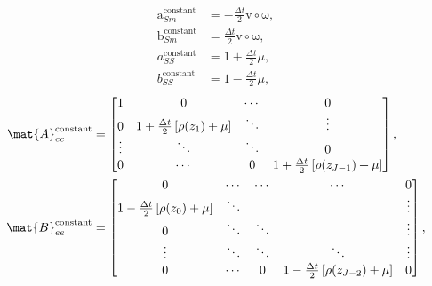 \documentclass{jpmarticle}
\renewcommand{\vec}[1]{\boldsymbol{\mathrm{#1}}}
\begin{document}
\begin{equation}
  \begin{split}
    \vec{a}_{Sm}^{\text{constant}} &=
    - \frac{\Delta t}{2} \vec{v} \circ \vec{\omega},
    \\
    \vec{b}_{Sm}^{\text{constant}} &=
    \frac{\Delta t}{2} \vec{v} \circ \vec{\omega},
    \\
    a_{SS}^{\text{constant}} &=
    1 + \frac{\Delta t}{2} \mu,
    \\
    b_{SS}^{\text{constant}} &=
    1 - \frac{\Delta t}{2} \mu,
  \end{split}
\end{equation}
\begin{equation}
  \begin{split}
    \mat{A}_{ee}^{\text{constant}} &=
    \begin{bmatrix}
      1 & 0 & \cdots & 0
      \\
      0 & 1 + \frac{\Delta t}{2} \left[\rho(z_1) + \mu\right] &
      \ddots & \vdots
      \\
      \vdots & \ddots & \ddots & 0
      \\
      0 & \cdots & 0 &
      1 + \frac{\Delta t}{2} \left[\rho(z_{J - 1}) + \mu\right]
    \end{bmatrix},
    \\
    \mat{B}_{ee}^{\text{constant}} &=
    \begin{bmatrix}
      0 & \cdots & \cdots & \cdots & 0
      \\
      1 - \frac{\Delta t}{2} \left[\rho(z_0) + \mu\right] & \ddots &
      & & \vdots
      \\
      0 & \ddots & \ddots & & \vdots
      \\
      \vdots & \ddots & \ddots & \ddots & \vdots
      \\
      0 & \cdots & 0 &
      1 - \frac{\Delta t}{2} \left[\rho(z_{J - 2}) + \mu\right] & 0
    \end{bmatrix},
  \end{split}
\end{equation}
\end{document}
